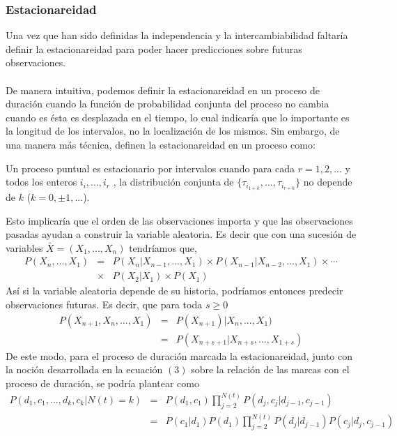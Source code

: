 \subsubsection{Estacionareidad}
Una vez que han sido definidas la independencia y la intercambiabilidad faltar\'ia definir la estacionareidad para poder hacer predicciones sobre futuras observaciones.\\
\\
De manera intuitiva, podemos definir la estacionareidad en un proceso de duraci\'on cuando la funci\'on de probabilidad conjunta del proceso no cambia cuando es \'esta es desplazada en el tiempo, lo cual indicar\'ia que lo importante es la longitud de los intervalos, no la localizaci\'on de los mismos. Sin embargo, de una manera m\'as t\'ecnica, \cite{daley2003} definen la estacionareidad en un proceso como:
\begin{defi}
Un proceso puntual es estacionario por intervalos cuando para cada $r=1,2,...$ y todos los enteros $i_i,...,i_r$ , la distribuci\'on conjunta de $\{\tau_{i_{1+k}},...,\tau_{i_{r+k}}\}$ no depende de $k$ ($k=0, \pm 1, ...$).
\end{defi}
Esto implicar\'ia que el orden de las observaciones importa y que las observaciones pasadas ayudan a construir la variable aleatoria. Es decir que con una sucesi\'on de variables $\bar{X}=(X_1,...,X_n)$ tendr\'iamos que,
\begin{eqnarray*}
P(X_n,...,X_1)&=&P(X_n|X_{n-1},...,X_1)\times P(X_{n-1}|X_{n-2},...,X_1)\times \cdots\\
               &\times& P(X_2|X_1)\times P(X_1)
\end{eqnarray*}	
As\'i si la variable aleatoria depende de su historia, podr\'iamos entonces predecir observaciones futuras. Es decir, que para toda $s \geq 0$
\begin{eqnarray*}
P(X_{n+1},X_n,...,X_1)&=&P(X_{n+1})|X_n,...,X_1)\\
                      &=&P(X_{n+s+1}|X_{n+s},...,X_{1+s}) \nonumber
\end{eqnarray*}
De este modo, para el proceso de duraci\'on marcada la estacionareidad, junto con la noci\'on desarrollada en la ecuaci\'on $(3)$ sobre la relaci\'on de las marcas con el proceso de duraci\'on, se podr\'ia plantear como
\begin{eqnarray*}
P(d_1,c_1,...,d_k,c_k|N(t)=k)&=&P(d_1,c_1)\prod_{j=2}^{N(t)} P(d_j,c_j|d_{j-1},c_{j-1})\\
                             &=&P(c_1|d_1)P(d_1) \prod_{j=2}^{N(t)} P(d_j|d_{j-1})P(c_j|d_j,c_{j-1}) 
\end{eqnarray*}
